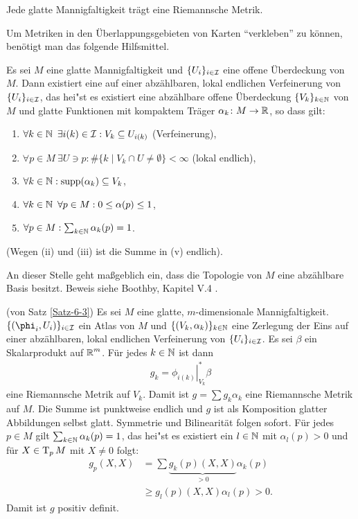 \begin{Satz}\label{Satz-6-3}
  Jede glatte Mannigfaltigkeit trägt eine Riemannsche Metrik.
\end{Satz}

Um Metriken in den Überlappungsgebieten von Karten "`verkleben"' zu können, benötigt man das folgende Hilfsmittel.

\begin{satz}
  Es sei $M$ eine glatte Mannigfaltigkeit und $\{U_i\}_{i \in \operatorname{\mathcal{I}}}$ eine offene Überdeckung von $M$.
  Dann existiert eine  auf einer abzählbaren, lokal endlichen Verfeinerung von $\{U_i\}_{i \in \operatorname{\mathcal{I}}}$, das hei"st es existiert eine abzählbare offene Überdeckung $\{V_k\}_{k\in\operatorname{\mathbb{N}}}$ von $M$ und glatte Funktionen mit kompaktem Träger $\alpha_k \colon M \to \operatorname{\mathbb{R}}$, so dass gilt:

  \begin{enumerate}[label=(\roman*)]
  \item $\forall k \in \operatorname{\mathbb{N}} \ \exists i(k) \in \operatorname{\mathcal{I}}: V_k \subseteq U_{i(k)}$ (Verfeinerung),
  \item $\forall p \in M \ \exists U \ni p: \# \{k \mid V_k \cap U \neq \emptyset \} < \infty$ (lokal endlich),
  \item $\forall k \in \operatorname{\mathbb{N}}: \operatorname{supp} (\alpha_k) \subseteq V_k$,
  \item $\forall k \in \operatorname{\mathbb{N}} \ \forall p \in M: 0 \leq \alpha(p) \leq 1$,
  \item $\forall p \in M: \sum_{k\in\operatorname{\mathbb{N}}}\alpha_k(p) = 1$.
  \end{enumerate}
  (Wegen (ii) und (iii) ist die Summe in (v) endlich).
\end{satz}
An dieser Stelle geht maßgeblich ein, dass die Topologie von $M$ eine abzählbare Basis besitzt. Beweis siehe Boothby, Kapitel V.4 \cite{boothby1986introduction}.

\begin{bew}(von Satz \ref{Satz-6-3})
Es sei $M$ eine glatte, $m$-dimensionale Mannigfaltigkeit. $\{(\phi_i,U_i)\}_{i \in \calI}$ ein Atlas von $M$ und $\{(V_k,\alpha_k)\}_{k \in \operatorname{\mathbb{N}}}$ eine Zerlegung der Eins auf einer abzählbaren, lokal endlichen Verfeinerung von $\{U_i\}_{i \in \operatorname{\mathcal{I}}}$. Es sei $\beta$ ein Skalarprodukt auf $\operatorname{\mathbb{R}}^m$. Für jedes $k \in \operatorname{\mathbb{N}}$ ist dann
\begin{align*}
	g_k = \left.\phi_{i(k)}\right|_{V_k}^{*}\beta
\end{align*}
eine Riemannsche Metrik auf $V_k$. Damit ist $g = \sum g_k\alpha_k$ eine Riemannsche Metrik auf $M$.
Die Summe ist punktweise endlich und $g$ ist als Komposition glatter Abbildungen selbst glatt.
Symmetrie und Bilinearität folgen sofort.
Für jedes $p \in M$ gilt $\sum_{k \in \operatorname{\mathbb{N}}}\alpha_k(p) = 1$, das hei"st es existiert ein $l \in \operatorname{\mathbb{N}}$ mit $\alpha_l(p) > 0$ und für $X \in \operatorname{T}_pM$ mit $X \neq 0$ folgt:
\begin{align*}
	g_p(X,X) & = \sum \underbrace{g_k(p)(X,X)}_{> 0}\alpha_k(p)\\
	& \geq g_l(p)(X,X)\alpha_l(p) > 0.
\end{align*}
Damit ist $g$ positiv definit.
\end{bew}

